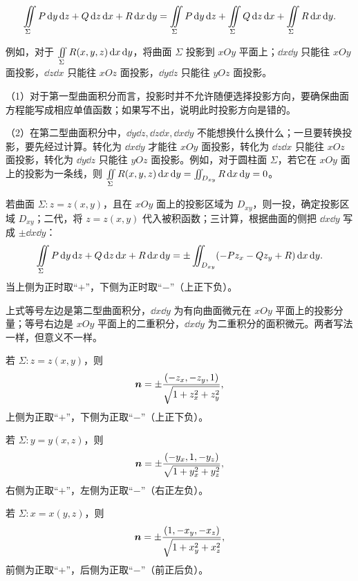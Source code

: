 
\[
\iintS P\dd y\dd z+Q\dd z\dd x+R\dd x\dd y
=\iintS P\dd y\dd z+\iintS Q\dd z\dd x+\iintS R\dd x\dd y.
\]

例如，对于 $\iint\limits_{\Sigma} R(x,y,z)\mathop{}\!\mathrm d x\mathop{}\!\mathrm d y$，将曲面 $\Sigma$ 投影到 $xOy$ 平面上；$\dd x\dd y$ 只能往 $xOy$ 面投影，$\dd z\dd x$ 只能往 $xOz$ 面投影，$\dd y\dd z$ 只能往 $yOz$ 面投影。

\begin{notebox}
（1）对于第一型曲面积分而言，投影时并不允许随便选择投影方向，要确保曲面方程能写成相应单值函数；如果写不出，说明此时投影方向是错的。

（2）在第二型曲面积分中，$\dd y\dd z,\dd z\dd x,\dd x\dd y$ 不能想换什么换什么；一旦要转换投影，要先经过计算。转化为 $\dd x\dd y$ 才能往 $xOy$ 面投影，转化为 $\dd z\dd x$ 只能往 $xOz$ 面投影，转化为 $\dd y\dd z$ 只能往 $yOz$ 面投影。例如，对于圆柱面 $\Sigma$，若它在 $xOy$ 面上的投影为一条线，则 $\iint\limits_{\Sigma} R(x,y,z)\mathop{}\!\mathrm d x\mathop{}\!\mathrm d y=\iint_{D_{xy}}R\mathop{}\!\mathrm d x\mathop{}\!\mathrm d y=0$。
\end{notebox}

若曲面 $\Sigma:z=z(x,y)$，且在 $xOy$ 面上的投影区域为 $D_{xy}$，则一投，确定投影区域 $D_{xy}$；二代，将 $z=z(x,y)$ 代入被积函数；三计算，根据曲面的侧把 $\dd x\dd y$ 写成 $\pm\dd x\dd y$：
\[
\iintS P\dd y\dd z+Q\dd z\dd x+R\dd x\dd y
=\pm\iint_{D_{xy}}(-Pz_x-Qz_y+R)\dd x\dd y.
\]
当上侧为正时取“$+$”，下侧为正时取“$-$”（上正下负）。

\begin{notebox}
上式等号左边是第二型曲面积分，$\dd x\dd y$ 为有向曲面微元在 $xOy$ 平面上的投影分量；等号右边是 $xOy$ 平面上的二重积分，$\dd x\dd y$ 为二重积分的面积微元。两者写法一样，但意义不一样。
\end{notebox}



若 $\Sigma:z=z(x,y)$，则
\[
\bm n=\pm\frac{(-z_x,-z_y,1)}{\sqrt{1+z_x^2+z_y^2}},
\]
上侧为正取“$+$”，下侧为正取“$-$”（上正下负）。

\begin{notebox}
若 $\Sigma:y=y(x,z)$，则
\[
\bm n=\pm\frac{(-y_x,1,-y_z)}{\sqrt{1+y_x^2+y_z^2}},
\]
右侧为正取“$+$”，左侧为正取“$-$”（右正左负）。

若 $\Sigma:x=x(y,z)$，则
\[
\bm n=\pm\frac{(1,-x_y,-x_z)}{\sqrt{1+x_y^2+x_z^2}},
\]
前侧为正取“$+$”，后侧为正取“$-$”（前正后负）。
\end{notebox}

